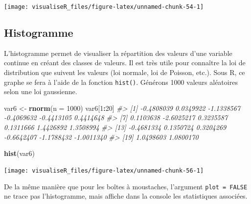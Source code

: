 \documentclass[]{article}
\newenvironment{Shaded}{\begin{snugshade}}{\end{snugshade}}
\newcommand{\CommentTok}[1]{\textcolor[rgb]{0.56,0.35,0.01}{\textit{#1}}}
\newcommand{\DataTypeTok}[1]{\textcolor[rgb]{0.13,0.29,0.53}{#1}}
\newcommand{\DecValTok}[1]{\textcolor[rgb]{0.00,0.00,0.81}{#1}}
\newcommand{\KeywordTok}[1]{\textcolor[rgb]{0.13,0.29,0.53}{\textbf{#1}}}
\newcommand{\NormalTok}[1]{#1}
\newcommand{\OperatorTok}[1]{\textcolor[rgb]{0.81,0.36,0.00}{\textbf{#1}}}
\newcommand{\StringTok}[1]{\textcolor[rgb]{0.31,0.60,0.02}{#1}}
\begin{document}
\begin{center}\texttt{[image: visualiseR\_files/figure-latex/unnamed-chunk-54-1]} \end{center}

\hypertarget{histogramme}{%
\subsection{Histogramme}\label{histogramme}}

L'histogramme permet de visualiser la répartition des valeurs d'une variable continue en créant des classes de valeurs. Il est très utile pour connaître la loi
de distribution que suivent les valeurs (loi normale, loi de Poisson, etc.). Sous R, ce graphe se fera à l'aide de la fonction \texttt{hist()}.
Générons 1000 valeurs aléatoires selon une loi gaussienne.

\begin{Shaded}
\begin{Highlighting}[]
\NormalTok{var6 <-}\StringTok{ }\KeywordTok{rnorm}\NormalTok{(}\DataTypeTok{n =} \DecValTok{1000}\NormalTok{)}
\NormalTok{var6[}\DecValTok{1}\OperatorTok{:}\DecValTok{20}\NormalTok{]}
\CommentTok{#>  [1] -0.4808039  0.0349922 -1.1338567 -0.4069632 -0.4413105  0.4414648}
\CommentTok{#>  [7]  0.1103638 -2.6025217  0.3235587  0.1311666  1.4426892  1.3508994}
\CommentTok{#> [13] -0.4681334  0.1350724  0.3204269 -0.6642407 -1.1788432 -1.0011340}
\CommentTok{#> [19]  1.0498603  1.0800170}
\end{Highlighting}
\end{Shaded}

\begin{Shaded}
\begin{Highlighting}[]
\KeywordTok{hist}\NormalTok{(var6)}
\end{Highlighting}
\end{Shaded}

\begin{center}\texttt{[image: visualiseR\_files/figure-latex/unnamed-chunk-56-1]} \end{center}

De la même manière que pour les boîtes à moustaches, l'argument \texttt{plot\ =\ FALSE} ne trace pas l'histogramme, mais affiche dans la console les statistiques associées.
\end{document}

